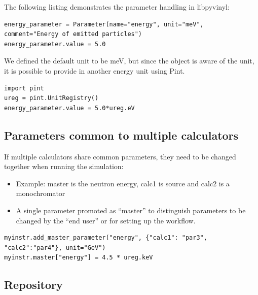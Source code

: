 \documentclass[11pt, a4paper]{article}
\begin{document}
  The following listing demonstrates the parameter handling in libpyvinyl:
    \begin{lstlisting}
energy_parameter = Parameter(name="energy", unit="meV", comment="Energy of emitted particles")
energy_parameter.value = 5.0
    \end{lstlisting}
  
  We defined the default unit to be meV, but since the object is aware of the unit, it is possible to provide in another energy unit using Pint.
  \begin{lstlisting}
import pint
ureg = pint.UnitRegistry()
energy_parameter.value = 5.0*ureg.eV
  \end{lstlisting}

\subsection{Parameters common to multiple calculators}
If multiple calculators share common parameters,
they need to be changed together when running the simulation:


    \begin{itemize}
    \item Example: master is the neutron energy, calc1 is source and calc2 is a monochromator
      
    \item A single parameter promoted as ``master'' to distinguish parameters to be changed by the ``end user'' or for setting up the workflow.
    \end{itemize}
  
  \begin{lstlisting}
myinstr.add_master_parameter("energy", {"calc1": "par3", "calc2":"par4"}, unit="GeV")
myinstr.master["energy"] = 4.5 * ureg.keV
\end{lstlisting}



\subsection{Repository}
\label{sec:lpv_repo}
\end{document}
